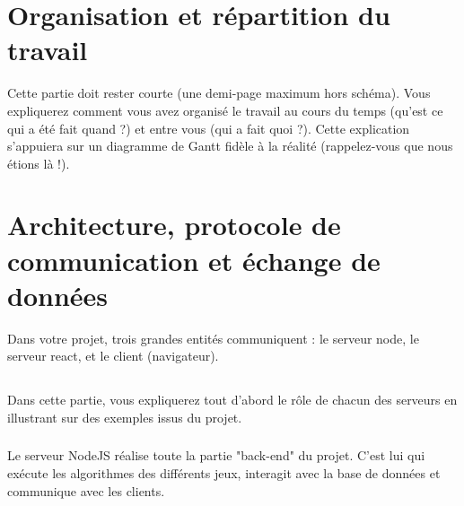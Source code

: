 \documentclass[a4paper]{article}
\begin{document}
\section{Organisation et répartition du travail}
 Cette partie doit rester courte (une demi-page maximum hors schéma). Vous expliquerez comment vous avez organisé le travail au cours du temps (qu’est ce qui a été fait quand ?) et entre vous (qui a fait quoi ?). Cette explication s’appuiera sur un diagramme de Gantt fidèle à la réalité (rappelez-vous que nous étions là !). 



\section{Architecture, protocole de communication et échange de données}

Dans votre projet, trois grandes entités communiquent : le serveur node, 
le serveur react, et le client (navigateur).
\subsection{} Dans cette partie, vous expliquerez tout d’abord le rôle de chacun des serveurs en 
illustrant sur des exemples issus du projet.
\subsubsection{} Le serveur NodeJS réalise toute la partie "back-end" du projet. C'est lui qui exécute les algorithmes des différents jeux, interagit avec la base de données et communique avec les clients.
\end{document}
